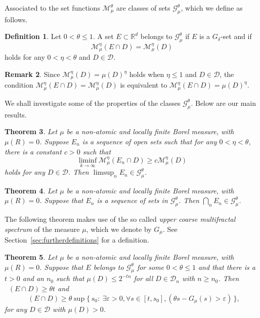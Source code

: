 \documentclass[11pt]{article}
\newtheorem{theo}{Theorem}[section]
\theoremstyle{definition}
\newtheorem{defi}[theo]{Definition}
\newtheorem{rema}[theo]{Remark}
\numberwithin{equation}{section}
\numberwithin{figure}{section}
\numberwithin{table}{section}
\DeclareMathOperator{\dimh}{dim_H}
\let\oldexists\exists
\renewcommand*{\exists}{\mathrel{\oldexists}}
\let\oldforall\forall
\renewcommand*{\forall}{\mathrel{\oldforall}}
\begin{document}
Associated to the set functions $\mathscr{M}_\mu^\theta$ are classes of sets $\mathscr{G}_\mu^\theta$, which we define as follows.

\begin{defi}\label{def:class}
Let $0 < \theta \leq 1$. A set $E \subset \mathbb{R}^d$ belongs to $\mathscr{G}_\mu^\theta$ if $E$ is a $G_\delta$-set and if
\[
\mathscr{M}_\mu^\eta (E \cap D) = \mathscr{M}_\mu^\eta (D)
\]
holds for any $0 < \eta < \theta$ and $D \in \mathscr{D}$.
\end{defi}

\begin{rema}
Since $\mathscr{M}_\mu^\eta (D) = \mu (D)^\eta$ holds when $\eta
\leq 1$ and $D \in \mathscr{D}$, the condition $\mathscr{M}_\mu^\eta (E \cap D) = \mathscr{M}_\mu^\eta (D)$ is equivalent to $\mathscr{M}_\mu^\eta (E \cap D) = \mu (D)^\eta$.
\end{rema}

We shall investigate some of the properties of the classes $\mathscr{G}_\mu^\theta$. Below are our main results.

\begin{theo}\label{the:limsup}
Let $\mu$ be a non-atomic and locally finite Borel measure, with $\mu (R) = 0$. Suppose $E_n$ is a sequence of open sets such that for any $0 < \eta < \theta$, there is a constant $c > 0$ such that
\[
\liminf_{k\to\infty} \mathscr{M}_\mu^\eta (E_n \cap D) \geq c
\mathscr{M}_\mu^\eta (D)
\]
holds for any $D \in \mathscr{D}$. Then $\limsup_n E_n \in
\mathscr{G}_\mu^\theta$.
\end{theo}

\begin{theo}\label{the:intersection}
Let $\mu$ be a non-atomic and locally finite Borel measure, with $\mu (R) = 0$. Suppose that $E_n$ is a sequence of sets in $\mathscr{G}_\mu^\theta$. Then $\bigcap_n E_n \in
\mathscr{G}_\mu^\theta$.
\end{theo}

The following theorem makes use of the so called \emph{upper coarse multifractal spectrum} of the measure $\mu$, which we denote by $G_\mu$. See Section~\ref{sec:furtherdefinitions} for a definition.

\begin{theo}\label{the:dimension}
Let $\mu$ be a non-atomic and locally finite Borel measure, with $\mu (R) = 0$. Suppose that $E$ belongs to $\mathscr{G}_\mu^\theta$ for some $0 < \theta \leq 1$ and that there is a $t > 0$ and an $n_0$ such that $\mu (D) \leq 2^{-tn}$ for all $D \in \mathscr{D}_n$ with $n \geq n_0$. Then $\dimh (E \cap D) \geq \theta t$ and
\[
\dimh (E \cap D) \geq \theta \sup \{\, s_0 :\; \exists \varepsilon > 0, \forall s\in [t,s_0], (\theta s - G_\mu (s) > \varepsilon) \,\},
\]
for any $D \in \mathscr{D}$ with $\mu (D) > 0$.
\end{theo}
\end{document}
